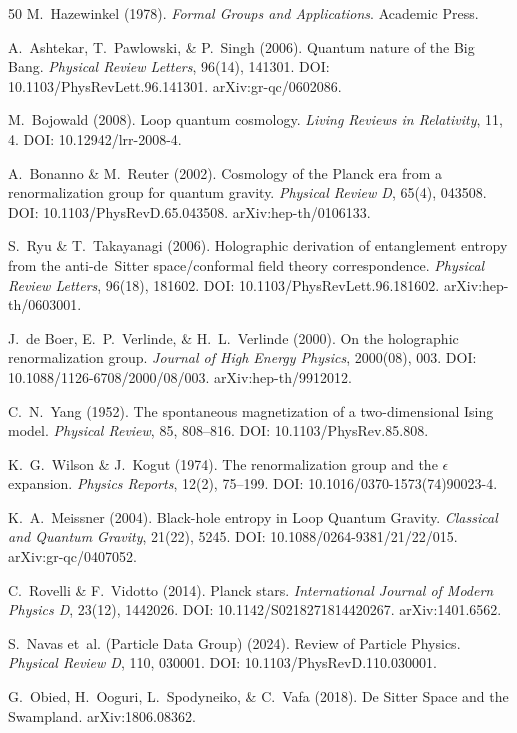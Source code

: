 \documentclass[aps,prd,twocolumn,superscriptaddress,nofootinbib]{revtex4-2}
\begin{document}
\begin{thebibliography}{50}
M.~Hazewinkel (1978).
\textit{Formal Groups and Applications}.
Academic Press.

A.~Ashtekar, T.~Pawlowski, \& P.~Singh (2006).
Quantum nature of the Big Bang.
\textit{Physical Review Letters}, 96(14), 141301.
DOI: 10.1103/PhysRevLett.96.141301.
arXiv:gr-qc/0602086.

M.~Bojowald (2008).
Loop quantum cosmology.
\textit{Living Reviews in Relativity}, 11, 4.
DOI: 10.12942/lrr-2008-4.

A.~Bonanno \& M.~Reuter (2002).
Cosmology of the Planck era from a renormalization group for quantum gravity.
\textit{Physical Review D}, 65(4), 043508.
DOI: 10.1103/PhysRevD.65.043508.
arXiv:hep-th/0106133.

S.~Ryu \& T.~Takayanagi (2006).
Holographic derivation of entanglement entropy from the anti-de~Sitter space/conformal field theory correspondence.
\textit{Physical Review Letters}, 96(18), 181602.
DOI: 10.1103/PhysRevLett.96.181602.
arXiv:hep-th/0603001.

J.~de Boer, E.~P.~Verlinde, \& H.~L.~Verlinde (2000).
On the holographic renormalization group.
\textit{Journal of High Energy Physics}, 2000(08), 003.
DOI: 10.1088/1126-6708/2000/08/003.
arXiv:hep-th/9912012.


C.~N.~Yang (1952).
The spontaneous magnetization of a two-dimensional Ising model.
\textit{Physical Review}, 85, 808--816.
DOI: 10.1103/PhysRev.85.808.

K.~G.~Wilson \& J.~Kogut (1974).
The renormalization group and the $\epsilon$ expansion.
\textit{Physics Reports}, 12(2), 75--199.
DOI: 10.1016/0370-1573(74)90023-4.

K.~A.~Meissner (2004).
Black-hole entropy in Loop Quantum Gravity.
\textit{Classical and Quantum Gravity}, 21(22), 5245.
DOI: 10.1088/0264-9381/21/22/015.
arXiv:gr-qc/0407052.

C.~Rovelli \& F.~Vidotto (2014).
Planck stars.
\textit{International Journal of Modern Physics D}, 23(12), 1442026.
DOI: 10.1142/S0218271814420267.
arXiv:1401.6562.

S.~Navas et~al. (Particle Data Group) (2024).
Review of Particle Physics.
\textit{Physical Review D}, 110, 030001.
DOI: 10.1103/PhysRevD.110.030001.

G.~Obied, H.~Ooguri, L.~Spodyneiko, \& C.~Vafa (2018).
De Sitter Space and the Swampland.
arXiv:1806.08362.


\end{thebibliography}
\end{document}
